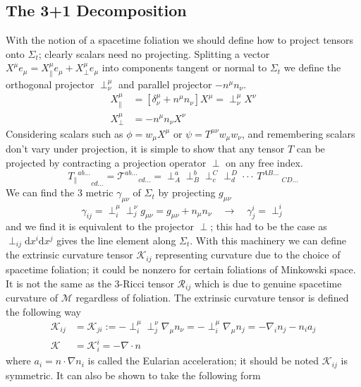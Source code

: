 \documentclass[11pt, oneside]{report}  %
\newcommand{\M}{\mathcal{M}}
\newcommand{\K}{\mathcal{K}}
\newcommand{\R}{\mathcal{R}}
\newcommand{\dd}{\mathrm{d}}
\numberwithin{equation}{section}
\begin{document}
\subsection{The 3+1 Decomposition}
With the notion of a spacetime foliation we should define how to project tensors onto $\Sigma_t$; clearly scalars need no projecting. Splitting a vector $X^\mu e_\mu = X^\mu_\| e_\mu + X^\mu_\perp e_\mu$ into components tangent or normal to $\Sigma_t$ we define the orthogonal projector $\perp^\mu_\nu$ and parallel projector $-n^\mu n_\nu$.
\begin{align}X^\mu_\| &= \left[ \delta^\mu_\nu + n^\mu n_\nu\right] X^\mu  = \perp^\mu_\nu X^\nu\\
X^\mu_\perp &= -n^\mu n_\nu X^\nu \end{align}
Considering scalars such as $\phi = w_\mu X^\mu$ or $\psi = T^{\mu\nu}w_\mu w_\nu$, and remembering scalars don't vary under projection, it is simple to show that any tensor $T$ can be projected by contracting a projection operator $\perp$ on any free index.
\begin{equation} {T_\|}^{ab ...}_{\;\;\;\;\;\;\;cd ...} = {\mathcal{T}}^{ab ...}_{\;\;\;\;\;\;\;cd ...} =\perp^{a}_{A}\perp^{b}_{B}\perp^{C}_{c}\perp^{D}_{d}\cdot\cdot\cdot\, T^{AB ...}_{\;\;\;\;\;\;\;\;\;\;CD ...}\end{equation}
We can find the 3 metric $\gamma_{\mu\nu}$ of $\Sigma_t$ by projecting $g_{\mu\nu}$ 
\begin{equation} \gamma_{ij} = \perp^\mu_i \perp^\nu_j g_{\mu\nu} = g_{\mu\nu} + n_\mu n_\nu\quad \rightarrow \quad \gamma^i_j = \perp^i_j\end{equation}
and we find it is equivalent to the projector $\perp$; this had to be the case as $\perp_{ij}\dd x^i\dd x^j$ gives the line element along $\Sigma_t$. With this machinery we can define the extrinsic curvature tensor $\K_{ij}$ representing curvature due to the choice of spacetime foliation; it could be nonzero for certain foliations of Minkowski space. It is not the same as the 3-Ricci tensor $\R_{ij}$ which is due to genuine spacetime curvature of $\M$ regardless of foliation. The extrinsic curvature tensor is defined the following way
\begin{align} \K_{ij}  &= \K_{ji}:= -\perp_i^\mu \perp_j^\nu \nabla_\mu n_\nu = -\perp_i^\mu \nabla_\mu n_j = -\nabla_i n_j - n_i a_j \\
\K &= \K_i^i = -\nabla \cdot n\end{align}
where $a_i = n\cdot\nabla n_i $ is called the Eularian acceleration; it should be noted $\K_{ij}$ is symmetric. It can also be shown to take the following form
\end{document}
